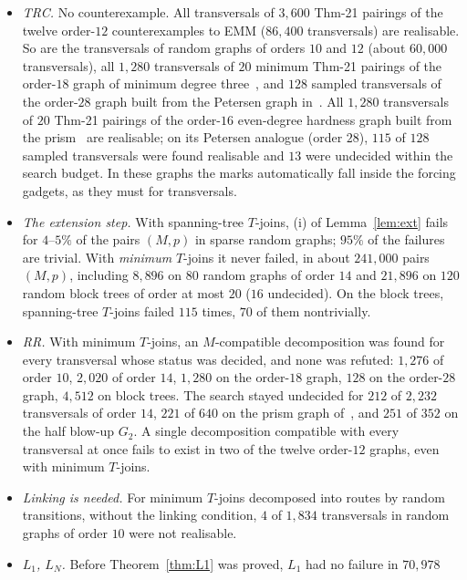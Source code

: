 \documentclass[11pt]{amsart}
\theoremstyle{definition}
\begin{document}
\begin{itemize}
\item \emph{TRC.} No counterexample. All transversals of $3{,}600$ Thm-21 pairings of the twelve order-$12$
counterexamples to EMM ($86{,}400$ transversals) are realisable. So are the transversals of
random graphs of orders $10$ and $12$ (about $60{,}000$ transversals), all $1{,}280$ transversals of $20$
minimum Thm-21 pairings of the order-$18$ graph of minimum degree three~\cite[Thm~41]{EMM}, and $128$
sampled transversals of the order-$28$ graph built from the Petersen graph in~\cite{EMM}. All
$1{,}280$ transversals of $20$ Thm-21 pairings of the order-$16$ even-degree hardness graph built from the
prism~\cite[Thm~45]{EMM} are realisable; on its Petersen analogue (order $28$), $115$ of $128$ sampled
transversals were found realisable and $13$ were undecided within the search budget. In these graphs the
marks automatically fall inside the forcing gadgets, as they must for transversals.
\item \emph{The extension step.} With spanning-tree $T$-joins, (i) of Lemma~\ref{lem:ext} fails for
$4$--$5\%$ of the pairs $(M,p)$ in sparse random graphs; $95\%$ of the failures are trivial. With
\emph{minimum} $T$-joins it never failed, in about $241{,}000$ pairs $(M,p)$, including $8{,}896$ on
$80$ random graphs of order $14$ and $21{,}896$ on $120$ random block trees of order at most $20$ ($16$
undecided). On the block trees, spanning-tree $T$-joins failed $115$ times, $70$ of them nontrivially.
\item \emph{RR.} With minimum $T$-joins, an $M$-compatible decomposition was found for every
transversal whose status was decided, and none was refuted: $1{,}276$ of order $10$, $2{,}020$ of order
$14$, $1{,}280$ on the order-$18$ graph, $128$ on the order-$28$ graph, $4{,}512$ on block trees. The
search stayed undecided for $212$ of $2{,}232$ transversals of order $14$, $221$ of $640$ on the prism
graph of~\cite[Thm~45]{EMM}, and $251$ of $352$ on the half blow-up $G_2$. A
single decomposition compatible with every transversal at once fails to exist in two of the twelve
order-$12$ graphs, even with minimum $T$-joins.
\item \emph{Linking is needed.} For minimum $T$-joins decomposed into routes by random
transitions, without the linking condition, $4$ of $1{,}834$ transversals in random graphs of order $10$
were not realisable.
\item \emph{$L_1$, $L_N$.} Before Theorem~\ref{thm:L1} was proved, $L_1$ had no failure in $70{,}978$

\end{itemize}
\end{document}
